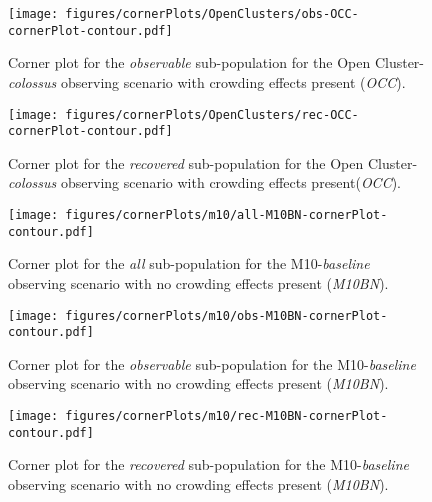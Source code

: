 \documentclass[twocolumn]{aastex63}
\begin{document}
\begin{figure}
    \centering
    \texttt{[image: figures/cornerPlots/OpenClusters/obs-OCC-cornerPlot-contour.pdf]}
    \caption{Corner plot for the \textit{observable} sub-population for the Open Cluster-\textit{colossus} observing scenario with crowding  effects present (\textit{OCC}).}
    \label{fig:occ-Obs-corner-plot-appendix}
\end{figure}\clearpage

\begin{figure}
    \centering
    \texttt{[image: figures/cornerPlots/OpenClusters/rec-OCC-cornerPlot-contour.pdf]}
    \caption{Corner plot for the \textit{recovered} sub-population for the Open Cluster-\textit{colossus} observing scenario with crowding  effects present(\textit{OCC}).}
    \label{fig:occ-Rec-corner-plot-appendix}
\end{figure}\clearpage

\begin{figure}
    \centering
    \texttt{[image: figures/cornerPlots/m10/all-M10BN-cornerPlot-contour.pdf]}
    \caption{Corner plot for the \textit{all} sub-population for the M10-\textit{baseline} observing scenario with no crowding effects present (\textit{M10BN}).}
    \label{fig:m10bn-All-corner-plot-appendix}
\end{figure}\clearpage

\begin{figure}
    \centering
    \texttt{[image: figures/cornerPlots/m10/obs-M10BN-cornerPlot-contour.pdf]}
    \caption{Corner plot for the \textit{observable} sub-population for the M10-\textit{baseline} observing scenario with no crowding effects present (\textit{M10BN}).}
    \label{fig:m10bn-Obs-corner-plot-appendix}
\end{figure}\clearpage

\begin{figure}
    \centering
    \texttt{[image: figures/cornerPlots/m10/rec-M10BN-cornerPlot-contour.pdf]}
    \caption{Corner plot for the \textit{recovered} sub-population for the M10-\textit{baseline} observing scenario with no crowding effects present (\textit{M10BN}).}
    \label{fig:m10bn-Rec-corner-plot-appendix}
\end{figure}\clearpage
\end{document}
